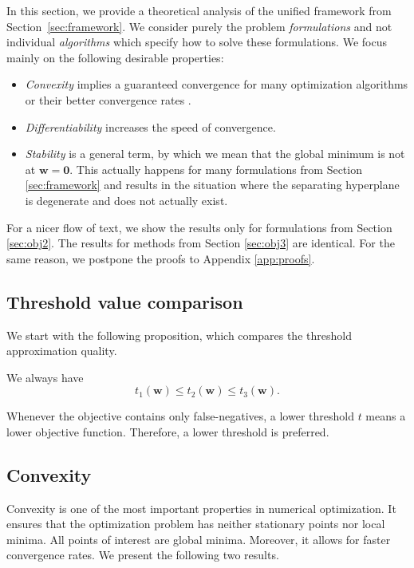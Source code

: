 \documentclass{Thesis}
\begin{document}
In this section, we provide a theoretical analysis of the unified framework from Section~\ref{sec:framework}. We consider purely the problem \textit{formulations} and not individual \textit{algorithms} which specify how to solve these formulations. We focus mainly on the following desirable properties:
\begin{itemize}
  \item \textit{Convexity} implies a guaranteed convergence for many optimization algorithms or their better convergence rates \cite{boyd.2004}.
  \item \textit{Differentiability} increases the speed of convergence.
  \item \textit{Stability} is a general term, by which we mean that the global minimum is not at $\bm{w} = \bm{0}$. This actually happens for many formulations from Section \ref{sec:framework} and results in the situation where the separating hyperplane is degenerate and does not actually exist.
\end{itemize}
For a nicer flow of text, we show the results only for formulations from Section \ref{sec:obj2}. The results for methods from Section \ref{sec:obj3} are identical. For the same reason, we postpone the proofs to Appendix \ref{app:proofs}.

\subsection{Threshold value comparison}

We start with the following proposition, which compares the threshold approximation quality.

\begin{proposition}\label{prop:threholds}
  We always have
  \begin{equation*}
    t_1(\bm{w}) \le t_2(\bm{w}) \le t_3(\bm{w}).
  \end{equation*}
\end{proposition}

\noindent Whenever the objective contains only false-negatives, a lower threshold $t$ means a lower objective function. Therefore, a lower threshold is preferred.

\subsection{Convexity}\label{sec:convexity}

Convexity is one of the most important properties in numerical optimization. It ensures that the optimization problem has neither stationary points nor local minima. All points of interest are global minima. Moreover, it allows for faster convergence rates. We present the following two results.
\end{document}
